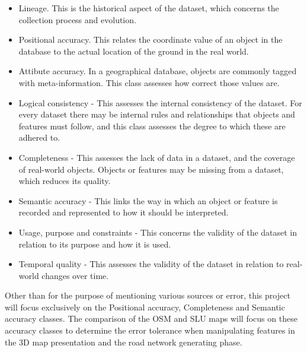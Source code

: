 \documentclass[a4paper]{article}
\begin{document}
\begin{itemize}
  \item Lineage. This is the historical aspect of the dataset, which concerns the collection process and evolution.
  \item Positional accuracy. This relates the coordinate value of an object in the database to the actual location of the ground in the real world.
  \item Attibute accuracy. In a geographical database, objects are commonly tagged with meta-information. This class assesses how correct those values are.
  \item Logical consistency - This assesses the internal consistency of the dataset. For every dataset there may be internal rules and relationships that objects and features must follow, and this class assesses the degree to which these are adhered to.
  \item Completeness - This assesses the lack of data in a dataset, and the coverage of real-world objects. Objects or features may be missing from a dataset, which reduces its quality.
  \item Semantic accuracy - This links the way in which an object or feature is recorded and represented to how it should be interpreted.
  \item Usage, purpose and constraints - This concerns the validity of the dataset in relation to its purpose and how it is used.
  \item Temporal quality - This assesses the validity of the dataset in relation to real-world changes over time.
\end{itemize}

Other than for the purpose of mentioning various sources or error, this project will focus exclusively on the Positional accuracy, Completeness and Semantic accuracy classes. The comparison of the OSM and SLU maps will focus on these accuracy classes to determine the error tolerance when manipulating features in the 3D map presentation and the road network generating phase.
\end{document}
